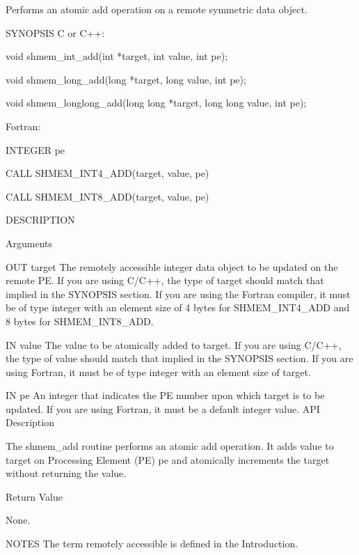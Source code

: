 Performs an atomic add operation on a remote symmetric data object.

SYNOPSIS
       C or C++:

	  void shmem_int_add(int *target, int value, int pe);

	  void shmem_long_add(long *target, long value, int pe);

	  void shmem_longlong_add(long long *target, long long value, int pe);

       Fortran:

	  INTEGER pe

	  CALL SHMEM_INT4_ADD(target, value, pe)

	  CALL SHMEM_INT8_ADD(target, value, pe)

DESCRIPTION
 
Arguments

       OUT      target	 The remotely accessible integer data object to be updated  on
	        	 the  remote  PE.   If you are using C/C++, the type of target
		         should match that implied in the SYNOPSIS  section.   If  you
			 are  using  the  Fortran compiler, it must be of type integer
			 with an element size of 4  bytes  for	SHMEM_INT4_ADD	and  8
			 bytes for SHMEM_INT8_ADD.

	IN      value	 The value to be atomically added to target.  If you are using
			 C/C++, the type of value should match	that  implied  in  the
			 SYNOPSIS  section.   If  you are using Fortran, it must be of
			 type integer with an element size of target.

       IN	pe	 An integer that indicates the PE number upon which target  is
			 to  be	 updated.   If	you  are  using	 Fortran, it must be a
			 default integer value.
API Description

       The shmem_add routine performs an atomic add operation.	It adds	 value
       to  target  on Processing Element (PE) pe and atomically increments the
       target without returning the value.

Return Value
       
       None.

NOTES
       The term remotely accessible is defined in the Introduction.


